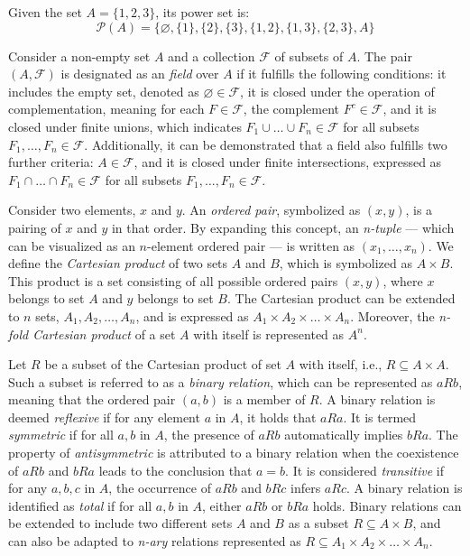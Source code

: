 \begin{example}
Given the set $A = \{1, 2, 3\}$, its power set is:
\[
\mathcal{P}(A) = \{\varnothing, \{1\}, \{2\}, \{3\}, \{1,2\}, \{1,3\}, \{2,3\}, A\}
\]
\end{example}

Consider a non-empty set $A$ and a collection $\mathcal{F}$ of subsets of $A$. The pair $\left( A, \mathcal{F} \right)$ is designated as an \emph{field} over $A$ if it fulfills the following conditions: it includes the empty set, denoted as $\varnothing \in \mathcal{F}$, it is closed under the operation of complementation, meaning for each $F \in \mathcal{F}$, the complement $F^c  \in \mathcal{F}$, and it is closed under finite unions, which indicates $F_1 \cup \ldots \cup F_n  \in \mathcal{F}$ for all subsets $F_1, \ldots, F_n \in \mathcal{F}$. Additionally, it can be demonstrated that a field also fulfills two further criteria: $A \in \mathcal{F}$, and it is closed under finite intersections, expressed as $F_1 \cap \ldots \cap F_n  \in \mathcal{F}$ for all subsets $F_1, \ldots, F_n \in \mathcal{F}$.


Consider two elements, $x$ and $y$. An \emph{ordered pair}, symbolized as $(x, y)$, is a pairing of $x$ and $y$ in that order. By expanding this concept, an \emph{n-tuple} — which can be visualized as an $n$-element ordered pair — is written as $(x_1, \ldots, x_n)$. We define the \emph{Cartesian product} of two sets $A$ and $B$, which is symbolized as $A \times B$. This product is a set consisting of all possible ordered pairs $(x, y)$, where $x$ belongs to set $A$ and $y$ belongs to set $B$. The Cartesian product can be extended to $n$ sets, $A_1, A_2, \dots, A_n$, and is expressed as $A_1 \times A_2 \times \dots \times A_n$. Moreover, the \emph{n-fold Cartesian product} of a set $A$ with itself is represented as $A^n$.

Let $R$ be a subset of the Cartesian product of set $A$ with itself, i.e., $R \subseteq A \times A$. Such a subset is referred to as a \emph{binary relation}, which can be represented as $aRb$, meaning that the ordered pair $(a, b)$ is a member of $R$. A binary relation is deemed \emph{reflexive} if for any element $a$ in $A$, it holds that $aRa$. It is termed \emph{symmetric} if for all $a, b$ in $A$, the presence of $aRb$ automatically implies $bRa$. The property of \emph{antisymmetric} is attributed to a binary relation when the coexistence of $aRb$ and $bRa$ leads to the conclusion that $a = b$. It is considered \emph{transitive} if for any $a, b, c$ in $A$, the occurrence of $aRb$ and $bRc$ infers $aRc$. A binary relation is identified as \emph{total} if for all $a, b$ in $A$, either $aRb$ or $bRa$ holds. Binary relations can be extended to include two different sets $A$ and $B$ as a subset $R \subseteq A \times B$, and can also be adapted to \emph{n-ary} relations represented as $R \subseteq A_1 \times A_2 \times \dots \times A_n$.


